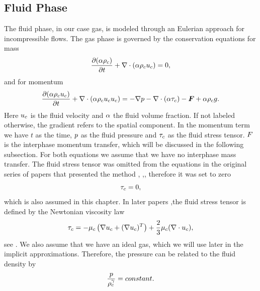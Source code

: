 \subsection{Fluid Phase}
The fluid phase, in our case gas, is modeled through an Eulerian approach for incompressible flows.
The gas phase is governed by the conservation equations for mass
\begin{equation}
    \dfrac{\partial (\alpha \rho_c)}{\partial t} + \nabla \cdot (\alpha \rho_c u_c) = 0,
\end{equation}
and for momentum
\begin{equation}
    \label{eq:momEul}
    \dfrac{\partial (\alpha \rho_c u_c)}{\partial t} + \nabla \cdot (\alpha \rho_c u_c u_c) = - \nabla p -\nabla \cdot (\alpha \tau_c)  - \boldsymbol{F} + \alpha \rho_c g.
\end{equation}
Here $u_c$ is the fluid velocity and $\alpha$ the fluid volume fraction.
If not labeled otherwise, the gradient refers to the spatial component.
In the momentum term
we have $t$ as the time, $p$ as the fluid pressure and $\tau_c$ as the fluid stress tensor. $F$ is the interphase momentum transfer, which will be discussed in the following subsection. 
For both equations we assume that we have no interphase mass transfer.
The fluid stress tensor was omitted from the equations in the original series of papers that presented the method \cite{MPPICFirst}, \cite{MP2d},\cite{MPInterpolation}, therefore it was set to zero
\begin{equation}
\label{eq:FlStTeZero}
    \tau_c = 0,
\end{equation}
which is also assumed in this chapter. %
In later papers \cite{chimera},the fluid stress tensor is defined by the Newtonian viscosity law
\begin{equation}
    \label{eq:fst}
    \tau_c = - \mu_c \left( \nabla u_c + ( \nabla u_c)^T \right) + \dfrac{2}{3} \mu_c ( \nabla \cdot u_c),
\end{equation}
see \cite{mathMPPIC}.
We also assume that we have an ideal gas, which we will use later in the implicit approximations. Therefore, the pressure can be related to the fluid density by
\begin{equation}
\label{eq:gasDensReal}
    \dfrac{p}{\rho_c^\gamma} = constant.
\end{equation}

